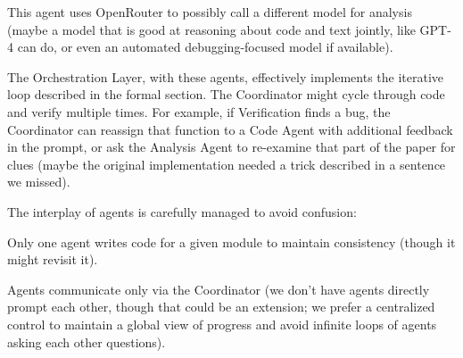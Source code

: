 \documentclass{ieeeaccess}
\begin{document}
\begin{itemize}
This agent uses OpenRouter to possibly call a different model for analysis (maybe a model that is good at reasoning about code and text jointly, like GPT-4 can do, or even an automated debugging-focused model if available).


\end{itemize}

The Orchestration Layer, with these agents, effectively implements the iterative loop described in the formal section. The Coordinator might cycle through code and verify multiple times. For example, if Verification finds a bug, the Coordinator can reassign that function to a Code Agent with additional feedback in the prompt, or ask the Analysis Agent to re-examine that part of the paper for clues (maybe the original implementation needed a trick described in a sentence we missed).

The interplay of agents is carefully managed to avoid confusion:

Only one agent writes code for a given module to maintain consistency (though it might revisit it).

Agents communicate only via the Coordinator (we don't have agents directly prompt each other, though that could be an extension; we prefer a centralized control to maintain a global view of progress and avoid infinite loops of agents asking each other questions).
\end{document}
